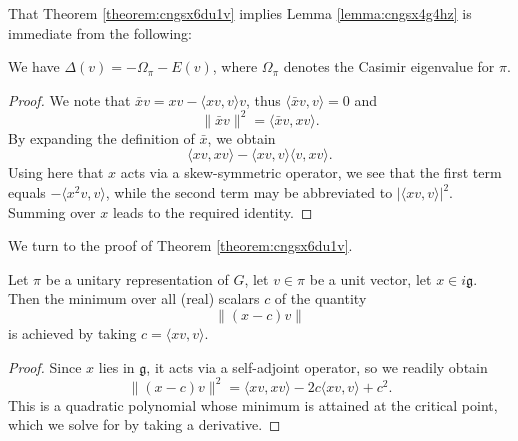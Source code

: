 \documentclass[reqno]{amsart} 
\begin{document}
That Theorem \ref{theorem:cngsx6du1v} implies Lemma \ref{lemma:cngsx4g4hz} is immediate from the following:
\begin{lemma}\label{lemma:cngsx6fp2j}
  We have $\Delta(v) = - \Omega_\pi - E(v)$, where $\Omega_\pi$ denotes the Casimir eigenvalue for $\pi$.
\end{lemma}
\begin{proof}
  We note that $\bar{x} v = x v - \langle x v, v \rangle v$, thus $\langle \bar{x} v, v \rangle = 0$ and
  \begin{equation*}
    \lVert \bar{x} v \rVert^2
    =
    \langle \bar{x} v, x v \rangle.
  \end{equation*}
  By expanding the definition of $\bar{x}$, we obtain
  \begin{equation*}
    \langle x v, x v \rangle
    -
    \langle x v, v \rangle \langle v, x v \rangle.
  \end{equation*}
  Using here that $x$ acts via a skew-symmetric operator, we see that the first term equals $- \langle x^2 v, v \rangle$, while the second term  may be abbreviated to $\lvert \langle x v, v \rangle \rvert^2$.  Summing over $x$ leads to the required identity.
\end{proof}

We turn to the proof of Theorem \ref{theorem:cngsx6du1v}.

\begin{lemma}\label{lemma:cngsx64916}
  Let $\pi$ be a unitary representation of $G$, let $v \in \pi$ be a unit vector, let $x \in i \mathfrak{g}$.  Then the minimum over all (real) scalars $c$ of the quantity
  \begin{equation*}
    \lVert (x - c) v \rVert
  \end{equation*}
  is achieved by taking $c = \langle x v, v \rangle$.
\end{lemma}
\begin{proof}
  Since $x$ lies in $\mathfrak{g}$, it acts via a self-adjoint operator, so we readily obtain
  \begin{equation}\label{eq:cngsx65skq}
    \lVert (x-c) v \rVert^2
    = \langle x v, x v \rangle
    - 2 c \langle x v, v \rangle
    + c^2.
  \end{equation}
  This is a quadratic polynomial whose minimum is attained at the critical point, which we solve for by taking a derivative.
\end{proof}
\end{document}
